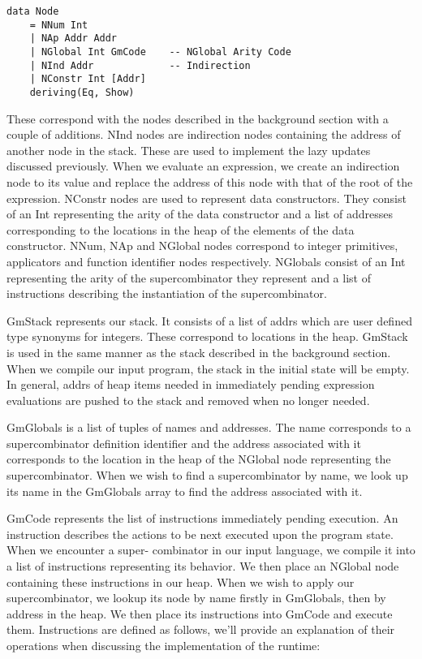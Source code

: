 \begin{verbatim}
data Node 
    = NNum Int 
    | NAp Addr Addr         
    | NGlobal Int GmCode    -- NGlobal Arity Code
    | NInd Addr             -- Indirection
    | NConstr Int [Addr]
    deriving(Eq, Show)
\end{verbatim}

These correspond with the nodes described in the background section
with a couple of additions. NInd nodes are indirection nodes 
containing the address of another node in the stack. These are
used to implement the lazy updates discussed previously. When we
evaluate an expression, we create an indirection node to its
value and replace the address of this node with that of the root
of the expression. NConstr nodes are used to represent data
constructors. They consist of an Int representing the arity
of the data constructor and a list of addresses corresponding to
the locations in the heap of the elements of the data constructor.
NNum, NAp and NGlobal nodes correspond to integer primitives, 
applicators and function identifier nodes respectively. NGlobals
consist of an Int representing the arity of the supercombinator
they represent and a list of instructions describing the 
instantiation of the supercombinator.

GmStack represents our stack. It consists of a list of addrs 
which are user defined type synonyms for integers. These 
correspond to locations in the heap. GmStack is used in the same
manner as the stack described in the background section. When we
compile our input program, the stack in the initial state will
be empty. In general, addrs
of heap items needed in immediately pending expression evaluations
are pushed to the stack and removed when no longer needed.

GmGlobals is a list of tuples of names and addresses. The name
corresponds to a supercombinator definition identifier and the
address associated with it corresponds to the location in the
heap of the NGlobal node representing the supercombinator. When
we wish to find a supercombinator by name, we look up its name
in the GmGlobals array to find the address associated with it.

GmCode represents the list of instructions immediately pending
execution. An instruction describes the actions to be next
executed upon the program state. When we encounter a super-
combinator in our input language, we compile it into a list
of instructions representing its behavior. We then place an
NGlobal node containing these instructions in our heap. When
we wish to apply our supercombinator, we lookup its node by
name firstly in GmGlobals, then by address in the heap. We
then place its instructions into GmCode and execute them.
Instructions are defined as follows, we'll provide an 
explanation of their operations when discussing the implementation
of the runtime:

